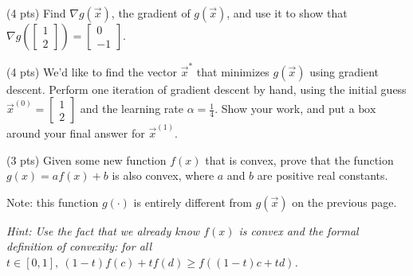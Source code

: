 \documentclass[twoside,12pt]{article}
\newcommand{\suraj}[1]{{\color{blue}[{\bf Suraj}: #1]}}
\begin{document}
\begin{probset}
\begin{prob}[(10 pts)]
\begin{subprobset}
\begin{subprob}(4 pts) Find $\nabla g(\vec{x})$, the gradient of $g(\vec{x})$, and use it to show that $\nabla g\left( \begin{bmatrix} 1 \\ 2 \end{bmatrix} \right) = \begin{bmatrix} 0 \\ -1 \end{bmatrix}$.

\begin{responsebox}{2.5in}
    
\end{responsebox}

\end{subprob}

\begin{subprob}(4 pts) We'd like to find the vector $\vec{x}^*$ that minimizes $g(\vec{x})$ using gradient descent. Perform one iteration of gradient descent by hand, using the initial guess $\vec{x}^{(0)} = \begin{bmatrix} 1 \\ 2 \end{bmatrix}$ and the learning rate $\alpha = \frac{1}{4}$. Show your work, and put a  $\boxed{\text{box}}$ around your final answer for $\vec{x}^{(1)}$.

\begin{responsebox}{2in}
    
\end{responsebox}
    
\end{subprob}

\newpage \begin{subprob}(3 pts)
    Given some new function $f(x)$ that is convex, prove that the function $g(x) = a f(x) + b$ is also convex, where $a$ and $b$ are positive real constants. 
    
    Note: this function $g(\cdot)$ is entirely different from $g(\vec{x})$ on the previous page.


    \textit{Hint: Use the fact that we already know $f(x)$ is convex and the formal definition of convexity: for all $t\in[0, 1], \ (1-t) f(c) + t f(d) \geq f\left((1-t)c + td\right)$.}

    \begin{responsebox}{2.5in}
            

\end{responsebox}
\end{subprob}
\end{subprobset}
\end{prob}
\end{probset}
\end{document}
